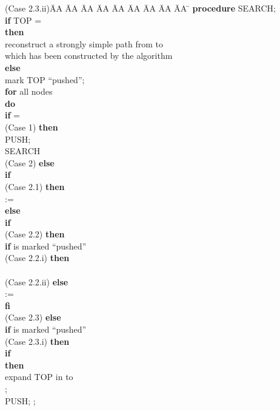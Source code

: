 \documentclass[12pt,twoside,a4paper]{article}
\begin{document}
\begin{tabbing}
(Case 2.3.ii)\= AA \= AA \= AA \= AA \= AA \= AA \= AA \= AA \= AA \= \kill
\> {\bf procedure} SEARCH; \\
\> {\bf if} TOP =  \\
\> {\bf then} \\
\> \> reconstruct a strongly simple path  from  to  \\
\> \> which has been constructed by the algorithm \\
\> {\bf else} \\
\> \> mark TOP ``pushed''; \\
\> \> {\bf for} all nodes  \\
\> \> {\bf do} \\
\> \> \> {\bf if}  =  \\
(Case 1) \> \> \> {\bf then} \\
\> \> \> \> PUSH; \\
\> \> \> \> SEARCH \\
(Case 2) \> \> \> {\bf else} \\
\> \> \> \> {\bf if}  \\
(Case 2.1) \> \> \> \> {\bf then} \\
\> \> \> \> \>  :=  \\
\> \> \> \> {\bf else} \\
\> \> \> \> \> {\bf if}  \\
(Case 2.2) \> \> \> \> \> {\bf then} \\
\> \> \> \> \> \> {\bf if}  is marked ``pushed'' \\
(Case 2.2.i) \> \> \> \> \> \> {\bf then} \\
\> \> \> \> \> \> \>  \\
(Case 2.2.ii) \> \> \> \> \> \> {\bf else} \\
\> \> \> \> \> \> \>  :=  \\
\> \> \> \> \> \> {\bf fi} \\
(Case 2.3) \> \> \> \> \> {\bf else} \\
\> \> \> \> \> \> {\bf if}  is marked ``pushed'' \\ 
(Case 2.3.i) \> \> \> \> \> \> {\bf then}\\
\> \> \> \> \> \> \> {\bf if}  \\
\> \> \> \> \> \> \> {\bf then} \\
\> \> \> \> \> \> \> \> expand TOP in  to \\
\> \> \> \> \> \> \> \> ; \\
\> \> \> \> \> \> \> \> PUSH; ;\\

\end{tabbing}
\end{document}
